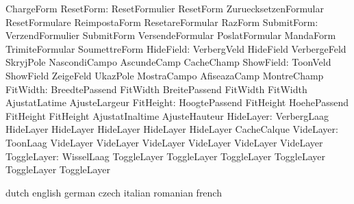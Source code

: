                            ChargeForm
                ResetForm: ResetFormulier            ResetForm
                           ZuruecksetzenFormular     ResetFormulare
                           ReimpostaForm             ResetareFormular
                           RazForm
               SubmitForm: VerzendFormulier          SubmitForm
                           VersendeFormular          PoslatFormular
                           MandaForm                 TrimiteFormular
                           SoumettreForm
                HideField: VerbergVeld               HideField
                           VerbergeFeld              SkryjPole
                           NascondiCampo             AscundeCamp
                           CacheChamp
                ShowField: ToonVeld                  ShowField
                           ZeigeFeld                 UkazPole
                           MostraCampo               AfiseazaCamp
                           MontreChamp
                 FitWidth: BreedtePassend            FitWidth
                           BreitePassend             FitWidth
                           FitWidth                  AjustatLatime
                           AjusteLargeur
                FitHeight: HoogtePassend             FitHeight
                           HoehePassend              FitHeight
                           FitHeight                 AjustatInaltime
                           AjusteHauteur
                HideLayer: VerbergLaag               HideLayer
                           HideLayer                 HideLayer
                           HideLayer                 HideLayer
                           CacheCalque
                VideLayer: ToonLaag                  VideLayer
                           VideLayer                 VideLayer
                           VideLayer                 VideLayer
                           VideLayer
              ToggleLayer: WisselLaag                ToggleLayer
                           ToggleLayer               ToggleLayer
                           ToggleLayer               ToggleLayer
                           ToggleLayer

\stopvariables


\startvariables            dutch                     english
                           german                    czech
                           italian                   romanian
                           french

